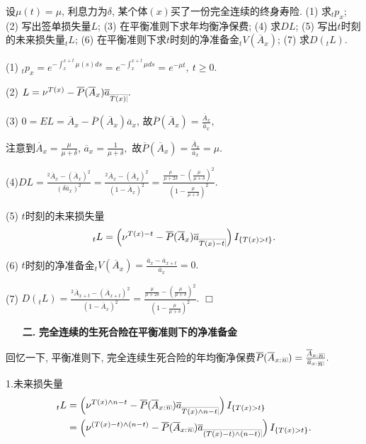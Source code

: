 \documentclass[a4paper,openany, 10pt]{ctexbook}
\makeatletter
\newcommand{\hei}{\CJKfamily{hei}}      %
\def\qed{\hfill$\Box$\medskip}
\def\z{\left}
\def\y{\right}
\DeclareRobustCommand{\annu}[1]{_{%
    \def\arraystretch{0}%
    \setlength\arraycolsep{1pt}%
    \setlength\arrayrulewidth{.2pt}%
    \begin{array}[b]{@{}c|}\hline
        \\[\arraycolsep]%
        \scriptstyle #1%
    \end{array}%
}}
\makeatother
\begin{document}
\begin{example}\label{l5.1}
    设$\mu(t)=\mu$, 利息力为$\delta$, 某个体$(x)$买了一份完全连续的终身寿险.
    (1) 求${}_tp_x$; (2) 写出签单损失量$L$;  (3) 在平衡准则下求年均衡净保费; (4) 求$DL$;
    (5) 写出$t$时刻的未来损失量${}_tL$;
    (6) 在平衡准则下求$t$时刻的净准备金$_tV(\overline A_x)$;
    (7) 求$D({}_tL).$

\end{example}
\solution
(1) $_tp_x=e^{-\int_x^{x+t}\mu(s)ds}=e^{-\int_x^{x+t}\mu ds}=e^{-\mu t},\ t\ge 0.$

(2) $L=\nu^{T(x)}-\overline P(\overline A_x)\overline a_{\annu {T(x)}}.$

(3) $0=EL=\overline A_x-\overline P(\overline A_x)\overline a_x$, 故$\overline P(\overline A_x)=\frac{\overline A_x}{\overline a_x},$

注意到$\overline A_x=\frac{\mu}{\mu+\delta}$, $\overline a_x=\frac{1}{\mu+\delta},$
故$\overline P(\overline A_x)=\frac{\overline A_x}{\overline a_x}=\mu.$

(4)$DL=\frac{^2\overline A_{x}-(\overline A_{x})^2}{(\delta\overline a_x)^2}=\frac{^2\overline A_{x}-(\overline A_{x})^2}{(1-\overline A_x)^2}=\frac{\frac{\mu}{\mu+2\delta}-(\frac{\mu}{\mu+\delta})^2}{(1-\frac{\mu}{\mu+\delta})^2}.$

(5) $t$时刻的未来损失量
$${}_tL=\z(\nu^{T(x)-t}-\overline{P}( \overline{A}_x )\overline a_{\annu {T(x)-t}}\y)I_{\{T(x)>t\}}.$$

(6) $t$时刻的净准备金$ {}_tV(\overline A_x)=\frac{\overline a_{x}-\overline a_{x+t}}{\overline a_x}=0.$

(7) $D({}_tL)=\frac{^2\overline A_{x+t}-(\overline A_{x+t})^2}{(1-\overline A_x)^2}=\frac{\frac{\mu}{\mu+2\delta}-(\frac{\mu}{\mu+\delta})^2}{(1-\frac{\mu}{\mu+\delta})^2}.$ \qed


\begin{itemize}
    \item[{\bf\hei 二.}]{\bf\hei 完全连续的生死合险在平衡准则下的净准备金}
\end{itemize}
回忆一下, 平衡准则下, 完全连续生死合险的年均衡净保费$\overline P(\overline A_{x:}{}\annu n)=\frac{\overline A_{x:}{}\annu n}{\overline a_{x:}{}\annu n}.$


1.未来损失量
\begin{align*}
    _tL&=\z(\nu^{T(x)\land n-t}-\overline P(\overline A_{x:}{}\annu n)\overline{a}_{\annu {T(x)\land n-t}}\y)I_{\{T(x)>t\}} \\
                        &=\z(\nu^{(T(x)-t)\land(n-t)}-\overline P(\overline A_{x:}{}\annu n)\overline{a}_{\annu {(T(x)-t)\land(n-t)}}\y)I_{\{T(x)>t\}}.\\
\end{align*}
\end{document}
